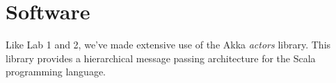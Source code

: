 \documentclass[11pt]{article}
\begin{document}



\section{Software}
Like Lab 1 and 2, we've made extensive use of the Akka \emph{actors}
library.  This library provides a hierarchical message passing
architecture for the Scala programming language.
\end{document}
